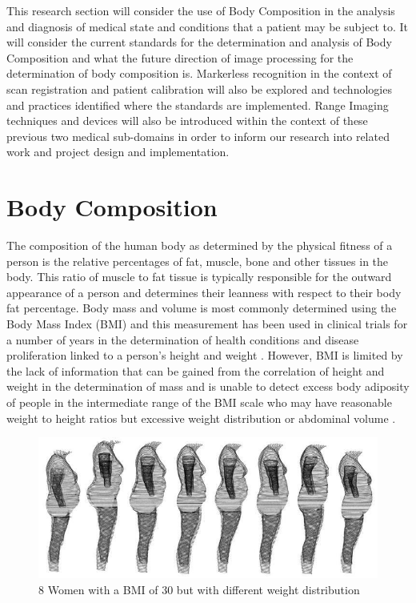 This research section will consider the use of Body Composition in the analysis and diagnosis of medical state and conditions that a patient may be subject to. 
It will consider the current standards for the determination and analysis of Body Composition and what the future direction of image processing for the determination of body composition is.
Markerless recognition in the context of scan registration and patient calibration will also be explored and technologies and practices identified where the standards are implemented. 
Range Imaging techniques and devices will also be introduced within the context of these previous two medical sub-domains in order to inform our research into related work and project design and implementation.

\section{Body Composition}

The composition of the human body as determined by the physical fitness of a person is the relative percentages of fat, muscle, bone and other tissues in the body. 
This ratio of muscle to fat tissue is typically responsible for the outward appearance of a person and determines their leanness with respect to their body fat percentage. 
Body mass and volume is most commonly determined using the Body Mass Index (BMI) and this measurement has been used in clinical trials for a number of years in the determination of health conditions and disease proliferation linked to a person's height and weight \cite{PrevalenceFlegal}. 
However, BMI is limited by the lack of information that can be gained from the correlation of height and weight in the determination of mass and is unable to detect excess body adiposity of people in the intermediate range of the BMI scale who may have reasonable weight to height ratios but excessive weight distribution or abdominal volume \cite{BMIAccuracy}.

\begin{figure}[t]
\label{bmi30}
	\centering
	\includegraphics[scale=0.6]{images/bmi30women.jpg}
	\caption{8 Women with a BMI of 30 but with different weight distribution}
\end{figure}

